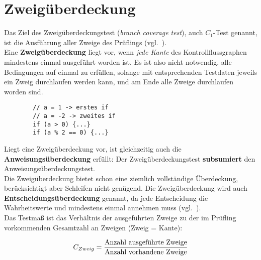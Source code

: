 \section{Zweigüberdeckung}


\begin{tcolorbox}[title={Zweigüberdeckung ($C_1$-Test)}]
    Das Ziel des Zweigüberdeckungstest (\textit{branch coverage test}), auch $C_1$-Test genannt, ist die Ausführung aller Zweige des Prüflings  (vgl.~\cite[88]{Lig09a}).\\

    Eine \textbf{Zweigüberdeckung} liegt vor, wenn \textit{jede Kante} des Kontrollflussgraphen mindestens einmal ausgeführt worden ist.
    Es ist also nicht notwendig, alle Bedingungen auf einmal zu erfüllen, solange mit entsprechenden Testdaten jeweils ein Zweig durchlaufen werden kann, und am Ende alle Zweige durchlaufen worden sind.
    \begin{verbatim}
        // a = 1 -> erstes if
        // a = -2 -> zweites if
        if (a > 0) {...}
        if (a % 2 == 0) {...}
    \end{verbatim}
    Liegt eine Zweigüberdeckung vor, ist gleichzeitig auch die \textbf{Anweisungsüberdeckung} erfüllt: Der Zweigüberdeckungstest \textbf{subsumiert} den Anweisungsüberdeckungstest.\\

    \noindent
    Die Zweigüberdeckung bietet schon eine ziemlich vollständige Überdeckung, berücksichtigt aber Schleifen nicht genügend.
    Die Zweigüberdeckung wird auch \textbf{Entscheidungsüberdeckung} genannt, da jede Entscheidung die Wahrheitswerte  und  mindestens einmal annehmen muss (vgl.~\cite[404]{Bal97}).\\


    \noindent
    Das Testmaß ist das Verhältnis der ausgeführten Zweige zu der im Prüfling vorkommenden Gesamtzahl an Zweigen (Zweig = Kante):

    \begin{equation}\notag
    C_{Zweig} = \frac{\text{Anzahl ausgeführte Zweige}}{\text{Anzahl vorhandene Zweige}}
    \end{equation}
\end{tcolorbox}